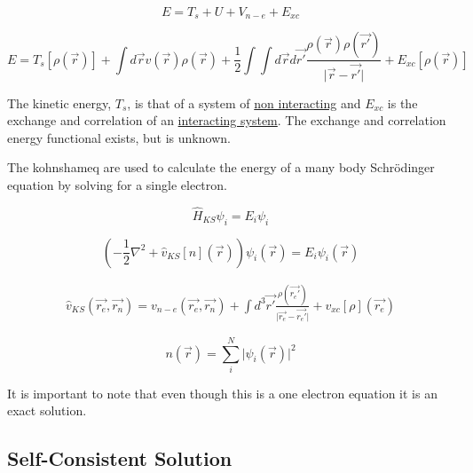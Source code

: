 \begin{equation}
E = T_{s} + U + V_{n-e} + E_{xc}
\end{equation}

\begin{equation}
E = T_{s}[\rho(\vec{r})] + \int d \vec{r} v(\vec{r}) \rho(\vec{r}) + \frac{1}{2} \int \int  d \vec{r} d \vec{r'} \frac{\rho(\vec{r}) \rho(\vec{r'}) }{\lvert \vec{r} - \vec{r'} \rvert} + E_{xc}[\rho(\vec{r})]
\end{equation}

The kinetic energy, $T_s$, is that of a system of \underline{non interacting} and $E_{xc}$ is the exchange and correlation of an \underline{interacting system}.  The exchange and correlation energy functional exists, but is unknown.  

The \Gls{kohnshameq} are used to calculate the energy of a many body Schr\"{o}dinger equation by solving for a single electron.

\begin{equation}
\hat{H}_{KS} \psi_{i} = E_{i} \psi_{i}
\label{eq:eqKS1}
\end{equation}

\begin{equation}
\left(-\frac{1}{2} \nabla^2 + \hat{v}_{KS}[n](\vec{r}) \right) \psi_{i}(\vec{r}) = E_{i} \psi_{i}(\vec{r})
\label{eq:eqKS2}
\end{equation}

\begin{equation}
\begin{split}
\hat{v}_{KS}(\vec{r_e}, \vec{r_n}) = v_{n-e}(\vec{r_e}, \vec{r_n}) + \int d^3\vec{r'} \frac{\rho(\vec{r_{e}'})}{\lvert \vec{r_{e}} - \vec{r_{e}'} \rvert } + v_{xc}[\rho](\vec{r_{e}})
\end{split}
\label{eq:eqGroundState}
\end{equation}

\begin{equation}
n(\vec{r}) = \sum_i^N \lvert \psi_{i}(\vec{r}) \lvert^2
\label{eq:eqKS2b}
\end{equation}



It is important to note that even though this is a one electron equation it is an exact solution.


\subsection{Self-Consistent Solution}
\FloatBarrier

